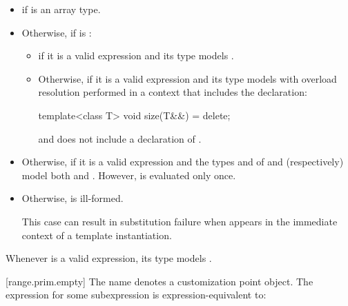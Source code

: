 \begin{itemize}
\item
   if  is an array
  type.

\item
  Otherwise, if
  is :
  \begin{itemize}
  \item
    if it is a valid expression and its type 
    models .

  \item
    Otherwise, 
    if it is a valid expression and its type 
    models 
    with overload resolution performed in a context that includes
    the declaration:
    \begin{codeblock}
    template<class T> void size(T&&) = delete;
    \end{codeblock}

    and does not include a declaration of .
  \end{itemize}

\item
  Otherwise, 
  if it is a valid expression and
  the types  and  of  and
   (respectively) model both
   and
  .
  However,  is evaluated only once.

\item
  Otherwise,  is ill-formed.
  \begin{note}
  This case can result in substitution failure when 
  appears in the immediate context of a template instantiation.
  \end{note}
\end{itemize}

\pnum
\begin{note}
Whenever  is a valid expression, its
type models .
\end{note}

[range.prim.empty]{}
\pnum
The name  denotes a customization point
object. The expression
 for some subexpression  is
expression-equivalent to:

